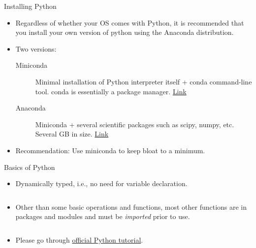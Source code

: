 \documentclass[aspectratio=169]{beamer}
\begin{document}
    \begin{frame}{Installing Python}
        \begin{itemize}
            \item Regardless of whether your OS comes with Python, it is recommended that you install your own version of python using the Anaconda distribution.
            \item Two versions:
            \begin{description}
                \item[Miniconda] Minimal installation of Python interpreter itself + conda command-line tool. conda is essentially a package manager. \href{https://docs.conda.io/en/latest/miniconda.html}{Link}
                \item[Anaconda] Miniconda + several scientific packages such as scipy, numpy, etc. Several GB in size. \href{https://www.anaconda.com/distribution/}{Link}
            \end{description}
            \item Recommendation: Use miniconda to keep bloat to a minimum.
        \end{itemize}
    \end{frame}


    \begin{frame}[fragile]{Basics of Python}
        \begin{itemize}
            \item Dynamically typed, i.e., no need for variable declaration.
            \inputminted{python}{example_basic_python.py}
            \item Other than some basic operations and functions, most other functions are in packages and modules and must be \textit{imported} prior to use.
            \inputminted{python}{example_imports.py}
            \item Please go through \href{https://docs.python.org/3/tutorial/index.html}{official Python tutorial}.
        \end{itemize}
    \end{frame}
\end{document}
